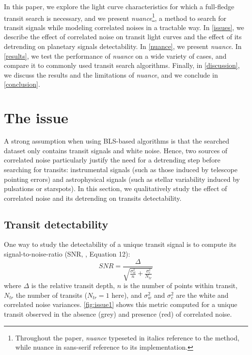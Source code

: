 \documentclass[modern]{aastex631}
\newcommand{\nuancemethod}{\textit{nuance}}
\newcommand{\nuance}{\nuancemethod{}}
\newcommand{\nuancecode}{\textsf{nuance}}
\begin{document}
In this paper, we explore the light curve characteristics for which a full-fledge transit search is necessary, and we present \nuancemethod{}\footnote{Throughout the paper, \nuancemethod{} typeseted in italics reference to the method, while \nuancecode{} in sans-serif reference to its implementation.}, a method to search for transit signals while modeling correlated noises in a tractable way. In \autoref{issues}, we describe the effect of correlated noise on transit light curves and the effect of its detrending on planetary signals detectability. In \autoref{nuance}, we present \nuance{}. In \autoref{results}, we test the performance of \nuance{} on a wide variety of cases, and compare it to commonly used transit search algorithms. Finally, in \autoref{discussion}, we discuss the results and the limitations of \nuance{}, and we conclude in \autoref{conclusion}.

\newpage
\section{The issue}\label{issues}

A strong assumption when using BLS-based algorithms is that the searched dataset only contains transit signals and white noise. Hence, two sources of correlated noise particularly justify the need for a detrending step before searching for transits: instrumental signals (such as those induced by telescope pointing errors) and astrophysical signals (such as stellar variability induced by pulsations or starspots). In this section, we qualitatively study the effect of correlated noise and its detrending on transits detectability.

\subsection{Transit detectability}

One way to study the detectability of a unique transit signal is to compute its signal-to-noise-ratio (SNR, \citealt{Pont2006}, Equation 12):
\begin{equation}\label{eq:snr}
  SNR= \frac{\Delta}{\sqrt{\frac{\sigma_w^2}{n} + \frac{\sigma_c^2}{N_{tr}}}}
\end{equation}
where $\Delta$ is the relative transit depth, $n$ is the number of points within transit, $N_{tr}$ the number of transits ($N_{tr}=1$ here), and $\sigma_w^2$ and $\sigma_c^2$ are the white and correlated noise variances. \autoref{fig:issue1} shows this metric computed for a unique transit observed in the absence (grey) and presence (red) of correlated noise.
\end{document}
